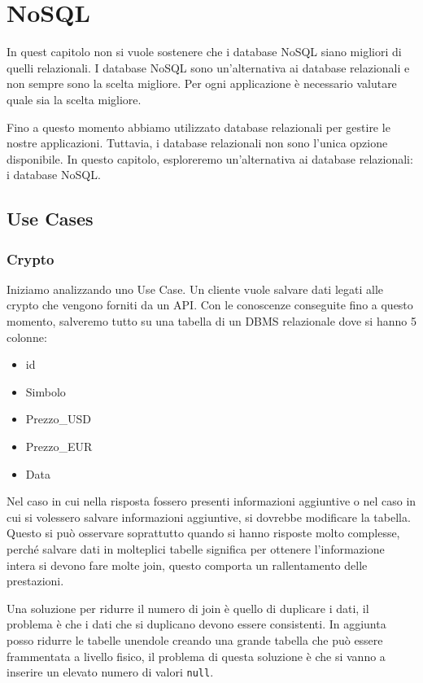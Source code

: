 \chapter{NoSQL}
\begin{nota}
      In quest capitolo non si vuole sostenere che i database NoSQL siano
      migliori di quelli relazionali. I database NoSQL sono un'alternativa
      ai database relazionali e non sempre sono la scelta migliore. Per ogni
      applicazione è necessario valutare quale sia la scelta migliore.
\end{nota}
Fino a questo momento abbiamo utilizzato database relazionali per gestire le
nostre applicazioni. Tuttavia, i database relazionali non sono l'unica
opzione disponibile. In questo capitolo, esploreremo un'alternativa ai
database relazionali: i database NoSQL.
\section*{Use Cases}
\subsection*{Crypto}
Iniziamo analizzando uno Use Case. Un cliente vuole salvare dati legati alle
crypto che vengono forniti da un API. Con le conoscenze conseguite fino a questo
momento, salveremo tutto su una tabella di un DBMS relazionale dove si hanno 5 colonne:
\begin{itemize}
      \item id
      \item Simbolo
      \item Prezzo\_USD
      \item Prezzo\_EUR
      \item Data
\end{itemize}
Nel caso in cui nella risposta fossero presenti informazioni aggiuntive o nel caso
in cui si volessero salvare informazioni aggiuntive, si dovrebbe modificare la
tabella. Questo si può osservare soprattutto quando si hanno risposte molto
complesse, perché salvare dati in molteplici tabelle significa per ottenere
l'informazione intera si devono fare molte join, questo comporta un rallentamento
delle prestazioni.

Una soluzione per ridurre il numero di join è quello di duplicare i dati, il
problema è che i dati che si duplicano devono essere consistenti. In aggiunta
posso ridurre le tabelle unendole creando una grande tabella che può essere
frammentata a livello fisico, il problema di questa soluzione è che si vanno a
inserire un elevato numero di valori \texttt{null}.

